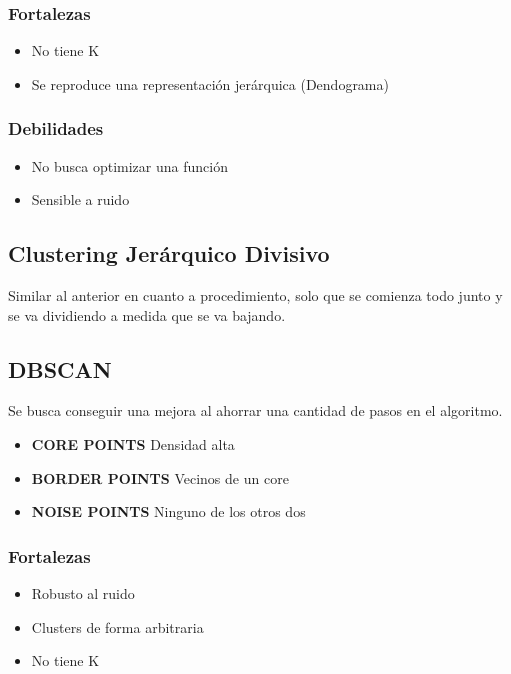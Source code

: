 \documentclass[titlepage,a4paper]{article}
\begin{document}
\subsubsection*{Fortalezas}
\begin{itemize}
    \item No tiene K
    \item Se reproduce una representación jerárquica (Dendograma)
\end{itemize}

\subsubsection*{Debilidades}
\begin{itemize}
    \item No busca optimizar una función
    \item Sensible a ruido
\end{itemize}

\subsection{Clustering Jerárquico Divisivo}
Similar al anterior en cuanto a procedimiento, solo que se comienza todo junto y se va dividiendo a medida que se va bajando.

\subsection{DBSCAN}
Se busca conseguir una mejora al ahorrar una cantidad de pasos en el algoritmo.

\begin{itemize}
    \item \textbf{CORE POINTS} Densidad alta
    \item \textbf{BORDER POINTS} Vecinos de un core
    \item \textbf{NOISE POINTS} Ninguno de los otros dos
\end{itemize}

\subsubsection*{Fortalezas}
\begin{itemize}
    \item Robusto al ruido
    \item Clusters de forma arbitraria
    \item No tiene K
\end{itemize}
\end{document}
